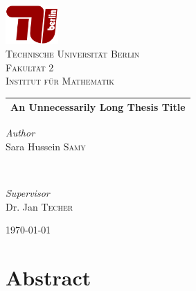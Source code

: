 \documentclass[12pt,a4paper]{article}
\begin{document}
\begin{titlepage}
\newcommand{\HRule}{\rule{\linewidth}{0.5mm}}
\begin{center}

\includegraphics[width=0.15\textwidth]{TU-Berlin-Logo.png}\\[1cm]
\textsc{\LARGE Technische Universität Berlin}\\[1.5cm]
\textsc{\large Fakultät 2}\\[0.5cm]
\textsc{\large Institut für Mathematik}\\[0.5cm]

\setlength{\aboverulesep}{10pt}
\setlength{\belowrulesep}{13pt}
\begin{tabularx}{\textwidth}{ >{\centering\arraybackslash}X}
\midrule[0.5mm]
\huge\bfseries An Unnecessarily Long Thesis Title\\
\midrule[0.5mm]
\end{tabularx}

\begin{minipage}{0.4\textwidth}
    \begin{flushleft}
        \large
        \textit{Author}\\
        Sara Hussein \textsc{Samy}
    \end{flushleft}
\end{minipage}
~
\begin{minipage}{0.4\textwidth}
    \begin{flushright}
        \large
        \textit{Supervisor}\\
        Dr. Jan \textsc{Techer}
    \end{flushright}
\end{minipage}

\vspace{260 pt}
{\large\today}
\end{center}
\end{titlepage}
\tableofcontents
\pagebreak
\section*{Abstract}
\pagebreak
\end{document}
